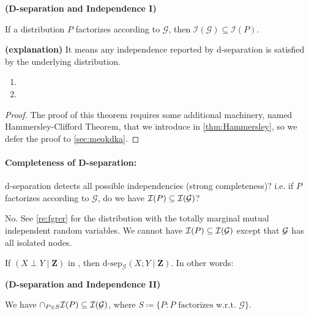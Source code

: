 \documentclass{article}
\newcommand{\bfs}[1]{\textbf{({#1}) }}
\begin{document}
\begin{thma}\bfs{D-separation and Independence I}\label{thm:dsep1}
\\\centerline{If a distribution $P$ factorizes according to $\mathcal{G}$, then $\mathcal{I}(\mathcal{G}) \subseteq \mathcal{I}(P)$.}
\end{thma}
\begin{rema}\bfs{explanation}
It means any independence reported by d-separation is satisfied by the underlying distribution.  
\begin{enumerate}
    \item {}
    \item {}
\end{enumerate}
\end{rema}
\begin{proof}
The proof of this theorem requires some additional machinery, named Hammersley-Clifford Theorem, that we introduce in \cref{thm:Hammersley}, so we defer the proof to \cref{sec:meqkdka}.
\end{proof}
\paragraph{Completeness of D-separation:}
 d-separation detects all possible independencies (strong completeness)? i.e. if $P$ factorizes according to $\mathcal{G}$, do we have $\mathcal{I}(P) \subseteq \mathcal{I}(\mathcal{G})$?

 No. See \cref{re:fgrer} for the distribution with the totally marginal mutual independent random variables. We cannot have $\mathcal{I}(P) \subseteq \mathcal{I}(\mathcal{G})$ except that $\mathcal{G}$ has all isolated nodes.


 If $(X \perp Y \mid \boldsymbol{Z})$ in , then {$\mathrm{d}$-$\mathrm{sep}$}$_{\mathcal{G}}(X ; Y \mid \boldsymbol{Z}) .$  In other words:
\begin{thma}\bfs{D-separation and Independence II}\label{thm:dsep2}\\
\centerline{We have $\cap_{P\in S}\mathcal{I}(P) \subseteq \mathcal{I}(\mathcal{G})$, where  $S\coloneqq \{P: P \text{ factorizes w.r.t. $\mathcal{G}$}\}$.}
\end{thma}
\end{document}
